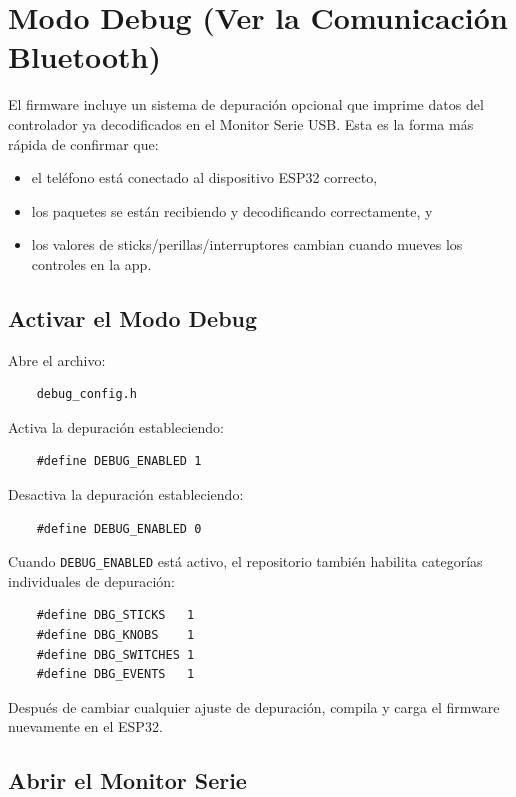 \section{Modo Debug (Ver la Comunicación Bluetooth)}
El firmware incluye un sistema de depuración opcional que imprime datos del controlador ya decodificados en el Monitor
Serie USB. Esta es la forma más rápida de confirmar que:
\begin{itemize}
    \item el teléfono está conectado al dispositivo ESP32 correcto,
    \item los paquetes se están recibiendo y decodificando correctamente, y
    \item los valores de sticks/perillas/interruptores cambian cuando mueves los controles en la app.
\end{itemize}

\subsection{Activar el Modo Debug}
Abre el archivo:

\begin{verbatim}
    debug_config.h
\end{verbatim}

Activa la depuración estableciendo:

\begin{verbatim}
    #define DEBUG_ENABLED 1
\end{verbatim}

Desactiva la depuración estableciendo:

\begin{verbatim}
    #define DEBUG_ENABLED 0
\end{verbatim}

Cuando \verb|DEBUG_ENABLED| está activo, el repositorio también habilita categorías individuales de depuración:

\begin{verbatim}
    #define DBG_STICKS   1
    #define DBG_KNOBS    1
    #define DBG_SWITCHES 1
    #define DBG_EVENTS   1
\end{verbatim}

Después de cambiar cualquier ajuste de depuración, compila y carga el firmware nuevamente en el ESP32.

\subsection{Abrir el Monitor Serie}

